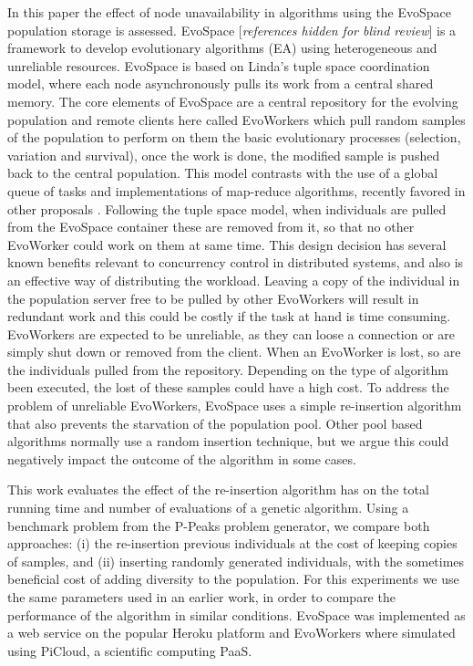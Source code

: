 \documentclass{llncs}
\begin{document}
In this paper the effect of node unavailability in algorithms using the 
EvoSpace population storage is assessed. EvoSpace [{\em references hidden for blind review}] is
a framework to develop evolutionary algorithms (EA) using 
heterogeneous and unreliable resources. EvoSpace is based on Linda's tuple
space \cite{Evospace} coordination model, where each node asynchronously
pulls its work from a central shared memory. The core elements of EvoSpace are a central 
repository for the evolving population and remote clients here called EvoWorkers
which pull random samples of the population to perform on them the basic evolutionary
processes (selection, variation and survival), once the work is done, the
modified sample is pushed back to the central population.
This model contrasts with  the use of a global queue of tasks and
implementations of map-reduce algorithms, recently favored in other proposals 
\cite{fazenda2012,di2013towards,FlexGP}.
Following the tuple space model, when individuals are pulled from the EvoSpace
container these are removed from it, so that no other EvoWorker could work on them at same time.
This design decision has several known benefits relevant to concurrency control 
in distributed systems, and also is an effective way of distributing the
workload. Leaving a copy of the individual in the population server free to
be pulled by other EvoWorkers will result in redundant work and this could be
costly if the task at hand is time consuming. EvoWorkers are expected to be 
unreliable, as they can loose a connection or are simply shut down or removed 
from the client. When an EvoWorker is lost, so are the individuals pulled from
the repository. Depending on the type of algorithm been executed, the lost of
these samples could have a high cost. To address the problem of unreliable 
EvoWorkers, EvoSpace uses a simple re-insertion algorithm that also 
prevents the starvation of the population pool. Other pool based algorithms
normally use a random insertion technique, but we argue this could negatively 
impact the outcome of the algorithm in some cases.  %

This work evaluates the effect 
of the re-insertion algorithm has on the total running time and number of evaluations 
of a genetic algorithm. Using  a benchmark problem from the P-Peaks 
problem generator, we compare both approaches: (i) the re-insertion previous
individuals at the cost of keeping copies of samples, and (ii) inserting  
randomly generated individuals, with the sometimes beneficial cost of 
adding diversity to the population. For this experiments we use the same
parameters used in an earlier work, in order to compare the 
performance of the algorithm in similar conditions.
EvoSpace was implemented as a web service on the popular Heroku platform 
and EvoWorkers where simulated using PiCloud, a scientific computing PaaS. 
\end{document}
